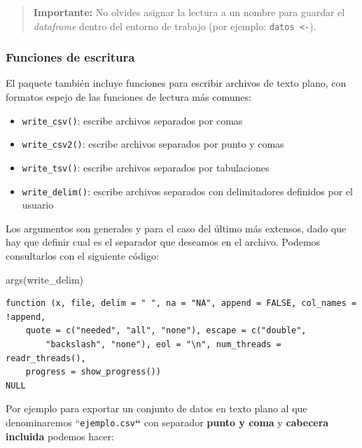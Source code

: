 \documentclass[
  spanish,
  letterpaper,
  DIV=11,
  numbers=noendperiod]{scrreprt}
\newenvironment{Shaded}{\begin{snugshade}}{\end{snugshade}}
\newcommand{\FunctionTok}[1]{\textcolor[rgb]{0.28,0.35,0.67}{#1}}
\newcommand{\NormalTok}[1]{\textcolor[rgb]{0.00,0.23,0.31}{#1}}
\newcounter{none} %
\providecommand{\tightlist}{%
  \setlength{\itemsep}{0pt}\setlength{\parskip}{0pt}}
\begin{document}
\begin{quote}
\textbf{Importante:} No olvides asignar la lectura a un nombre para
guardar el \emph{dataframe} dentro del entorno de trabajo (por ejemplo:
\texttt{datos\ \textless{}-}).
\end{quote}

\subsubsection{Funciones de escritura}\label{funciones-de-escritura}

El paquete también incluye funciones para escribir archivos de texto
plano, con formatos espejo de las funciones de lectura más comunes:

\begin{itemize}
\tightlist
\item
  \texttt{write\_csv()}: escribe archivos separados por comas
\item
  \texttt{write\_csv2()}: escribe archivos separados por punto y comas
\item
  \texttt{write\_tsv()}: escribe archivos separados por tabulaciones
\item
  \texttt{write\_delim()}: escribe archivos separados con delimitadores
  definidos por el usuario
\end{itemize}

Los argumentos son generales y para el caso del último más extensos,
dado que hay que definir cual es el separador que deseamos en el
archivo. Podemos consultarlos con el siguiente código:

\begin{Shaded}
\begin{Highlighting}[]
\FunctionTok{args}\NormalTok{(write\_delim)}
\end{Highlighting}
\end{Shaded}

\begin{verbatim}
function (x, file, delim = " ", na = "NA", append = FALSE, col_names = !append, 
    quote = c("needed", "all", "none"), escape = c("double", 
        "backslash", "none"), eol = "\n", num_threads = readr_threads(), 
    progress = show_progress()) 
NULL
\end{verbatim}

Por ejemplo para exportar un conjunto de datos en texto plano al que
denominaremos ``\texttt{ejemplo.csv}\textbf{``} con separador
\textbf{punto y coma} y \textbf{cabecera incluida} podemos hacer:
\end{document}
